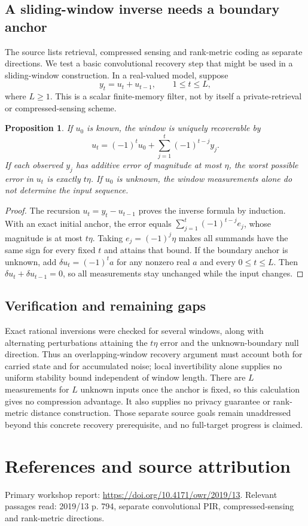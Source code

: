 \documentclass[11pt]{article}
\newtheorem{proposition}{Proposition}
\begin{document}
\subsection{A sliding-window inverse needs a boundary anchor}
The source lists retrieval, compressed sensing and rank-metric coding as separate directions. We test a basic convolutional recovery step that might be used in a sliding-window construction. In a real-valued model, suppose
\[
y_t=u_t+u_{t-1},\qquad 1\le t\le L,
\]
where $L\ge1$. This is a scalar finite-memory filter, not by itself a private-retrieval or compressed-sensing scheme.
\begin{proposition}
If $u_0$ is known, the window is uniquely recoverable by
\[
u_t=(-1)^tu_0+\sum_{j=1}^t(-1)^{t-j}y_j.
\]
If each observed $y_j$ has additive error of magnitude at most $\eta$, the worst possible error in $u_t$ is exactly $t\eta$. If $u_0$ is unknown, the window measurements alone do not determine the input sequence.
\end{proposition}
\begin{proof}
The recursion $u_t=y_t-u_{t-1}$ proves the inverse formula by induction. With an exact initial anchor, the error equals $\sum_{j=1}^t(-1)^{t-j}e_j$, whose magnitude is at most $t\eta$. Taking $e_j=(-1)^j\eta$ makes all summands have the same sign for every fixed $t$ and attains that bound. If the boundary anchor is unknown, add $\delta u_t=(-1)^t a$ for any nonzero real $a$ and every $0\le t\le L$. Then $\delta u_t+\delta u_{t-1}=0$, so all measurements stay unchanged while the input changes.
\end{proof}
\subsection{Verification and remaining gaps}
Exact rational inversions were checked for several windows, along with alternating perturbations attaining the $t\eta$ error and the unknown-boundary null direction. Thus an overlapping-window recovery argument must account both for carried state and for accumulated noise; local invertibility alone supplies no uniform stability bound independent of window length. There are $L$ measurements for $L$ unknown inputs once the anchor is fixed, so this calculation gives no compression advantage. It also supplies no privacy guarantee or rank-metric distance construction. Those separate source goals remain unaddressed beyond this concrete recovery prerequisite, and no full-target progress is claimed.

\section{References and source attribution}
Primary workshop report: \url{https://doi.org/10.4171/owr/2019/13}. Relevant passages read: 2019/13 p. 794, separate convolutional PIR, compressed-sensing and rank-metric directions.
\end{document}
